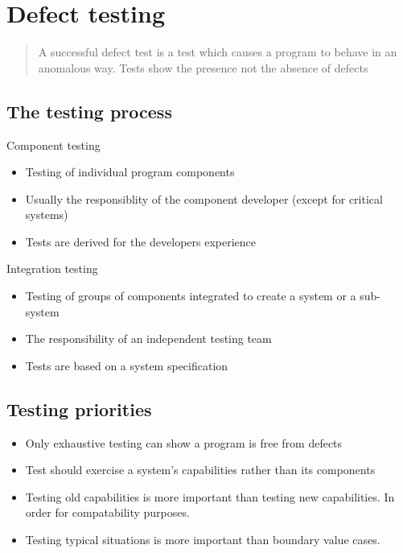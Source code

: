 \documentclass{article}
\begin{document}
\pagebreak

\section{Defect testing}

\begin{quote}
A successful defect test is a test which causes a program to behave in an anomalous way. Tests show the presence not the absence of defects
\end{quote}

\subsection{The testing process}
\begin{flushleft}
Component testing
\begin{itemize}
  \item Testing of individual program components
  \item Usually the responsiblity of the component developer (except for critical systems)
  \item Tests are derived for the developers experience
\end{itemize}
Integration testing
\begin{itemize}
  \item Testing of groups of components integrated to create a system or a sub-system
  \item The responsibility of an independent testing team
  \item Tests are based on a system specification
\end{itemize}
\end{flushleft}

\subsection{Testing priorities}

\begin{itemize}
  \item Only exhaustive testing can show a program is free from defects
  \item Test should exercise a system's capabilities rather than its components
  \item Testing old capabilities is more important than testing new capabilities. In order for compatability purposes.
  \item Testing typical situations is more important than boundary value cases.
\end{itemize}
\end{document}
